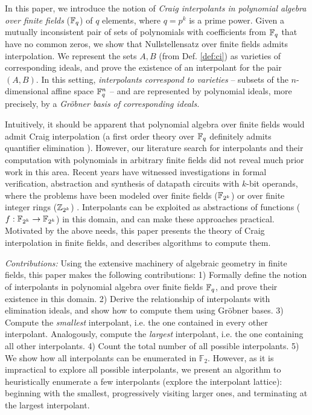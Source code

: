 In this paper, we introduce the notion of {\it Craig interpolants in
polynomial algebra over finite fields} (${\mathbb{F}}_{q}$) of $q$ elements, where
$q = p^k$ is a prime power. Given a mutually inconsistent pair of sets
of polynomials with coefficients from ${\mathbb{F}}_{q}$ that have no common zeros,
we show that Nullstellensatz over finite fields admits
interpolation. We represent the sets $A, B$ (from Def. \ref{def:ci}) as
{varieties of corresponding ideals}, and prove the existence of
an interpolant for the pair $(A,B)$. In this setting, {\it interpolants
correspond to varieties} -- subsets of the $n$-dimensional affine
space ${\mathbb{F}}_{q}^n$ -- and are represented by polynomial ideals, more
precisely, by a {\it Gr\"obner basis of corresponding ideals.}

Intuitively, it should be apparent that polynomial algebra over finite
fields would admit Craig interpolation (a first order theory over
${\mathbb{F}}_{q}$ definitely admits quantifier elimination \cite{gao:qe-gf-gb}).
However, our literature search for interpolants and their computation
with polynomials in arbitrary finite fields did not reveal much prior
work in this area. %
Recent years have witnessed
investigations in formal verification, abstraction and synthesis of
datapath circuits with $k$-bit operands, where the problems have been
modeled 
over finite fields (${\mathbb{F}}_{2^k}$) \cite{pruss:tcad} \cite{xiaojun:hldvt2016}
or over finite integer rings (${\mathbb{Z}}_{2^k}$) \cite{sivaram:todaes}. 
Interpolants can be exploited as abstractions of functions
($f:{\mathbb{F}}_{2^k}\rightarrow{\mathbb{F}}_{2^k}$) in this domain, and can make these
approaches practical. Motivated by the above needs, this paper
presents the theory of Craig interpolation in finite fields, and
describes algorithms to compute them.  


{\it Contributions:} Using the extensive machinery of algebraic
geometry in finite fields,
this paper makes the following contributions: 
1) Formally define the notion of interpolants in polynomial algebra
  over finite fields ${\mathbb{F}}_{q}$, and prove their existence in this domain.
2) Derive the relationship of interpolants with elimination ideals,
  and show how to compute them using Gr\"obner bases. 
3) Compute the {\it smallest} interpolant, i.e. the one
  contained in every other interpolant. Analogously, compute the
  {\it largest} interpolant, i.e. the one containing all
  other interpolants. 
4) Count the total number of all possible interpolants.
5) We show how all interpolants can be enumerated in
$\mathbb{F}_2$. However, as it is impractical to explore all possible
interpolants, we present an algorithm to heuristically enumerate a few
interpolants (explore the interpolant lattice): beginning with the
smallest, progressively visiting larger ones,   and terminating at the
largest interpolant.  

